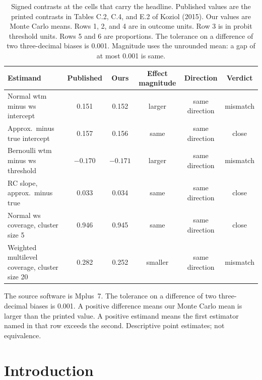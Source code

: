 \begin{table}[ht!]
\centering
\footnotesize
\setlength{\tabcolsep}{3.5pt}
\renewcommand{\arraystretch}{1.15}
\caption{Signed contrasts at the cells that carry the headline.
Published values are the printed contrasts in Tables C.2, C.4, and E.2 of
Koziol (2015).
Our values are Monte Carlo means.
Rows 1, 2, and 4 are in outcome units.
Row 3 is in probit threshold units.
Rows 5 and 6 are proportions.
The tolerance on a difference of two three-decimal biases is 0.001.
Magnitude uses the unrounded mean: a gap of at most 0.001 is same.}
\label{tab:headline}
\begin{tabular}{@{}p{2.05in}ccccc@{}}
\toprule
Estimand & Published & Ours & Effect magnitude & Direction & Verdict \\
\midrule
Normal wtm minus ws intercept & 0.151 & 0.152 & larger & same direction & mismatch \\
Approx.\ minus true intercept & 0.157 & 0.156 & same & same direction & close \\
Bernoulli wtm minus ws threshold & $-0.170$ & $-0.171$ & larger & same direction & mismatch \\
RC slope, approx.\ minus true & 0.033 & 0.034 & same & same direction & close \\
Normal ws coverage, cluster size 5 & 0.946 & 0.945 & same & same direction & close \\
Weighted multilevel coverage, cluster size 20 & 0.282 & 0.252 & smaller & same direction & mismatch \\
\bottomrule
\end{tabular}

\vspace{0.4em}
\begin{minipage}{0.98\textwidth}
\footnotesize
The source software is Mplus~7.
The tolerance on a difference of two three-decimal biases is 0.001.
A positive difference means our Monte Carlo mean is larger than the printed value.
A positive estimand means the first estimator named in that row exceeds the second.
Descriptive point estimates; not equivalence.
\end{minipage}
\end{table}

\section{Introduction}

